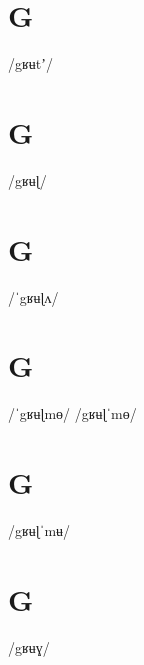 \documentclass[10pt,a4paper,twoside]{book}
\begin{document}
\section*{G}

\begin{multicols}{3}
 {/gʁʉtʼ/} {}
\end{multicols}

\section*{G}

\begin{multicols}{3}
 {/gʁʉɭ/} {}
\end{multicols}

\section*{G}

\begin{multicols}{3}
 {/ˈgʁʉɭʌ/} {}
\end{multicols}

\section*{G}

\begin{multicols}{3}
 {/ˈgʁʉɭmɵ/} {}
 {/gʁʉɭˈmɵ/} {}
\end{multicols}

\section*{G}

\begin{multicols}{3}
 {/gʁʉɭˈmʉ/} {}
\end{multicols}

\section*{G}

\begin{multicols}{3}
 {/gʁʉɣ/} {}
\end{multicols}
\end{document}
